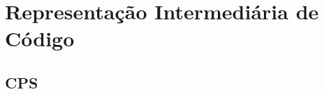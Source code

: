 \chapter{Representação Intermediária de Código}\label{ch:IR}

\section{CPS}\label{sec:cps}









